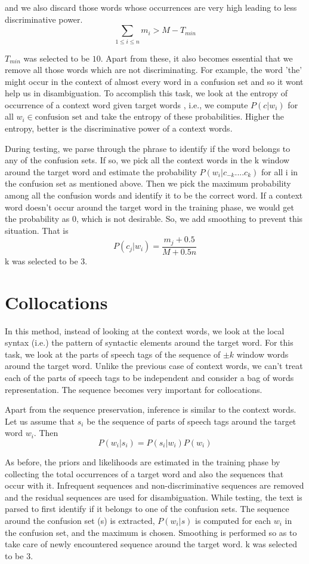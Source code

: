 \documentclass{article}
\begin{document}
and we also discard those words whose occurrences are very high leading to less discriminative power.
\[
\sum_{1\leq i \leq n} m_{i} > M - T_{min} 
\] 

$T_{min}$ was selected to be $10$. Apart from these, it also becomes essential that we remove all those words which are not discriminating. For example, the word 'the' might occur in the context of almost every word in a confusion set and so it wont help us in disambiguation. To accomplish this task, we look at the entropy of occurrence of a context word given target words , i.e., we compute $P(c|w_{i})$ for all $w_{i} \in \mbox{confusion set}$ and take the entropy of these probabilities. Higher the entropy, better is the discriminative power of a context words.

During testing, we parse through the phrase to identify if the word belongs to any of the confusion sets. If so, we pick all the context words in the k window around the target word and estimate the probability $P(w_{i}|c_{-k}....c_{k})$ for all i in the confusion set as mentioned above. Then we pick the maximum probability among all the confusion words and identify it to be the correct word. If a context word doesn't occur around the target word in the training phase, we would get the probability as $0$, which is not desirable. So, we add smoothing to prevent this situation. That is
\[
 P(c_{j}|w_{i}) = \frac{m_{j}+0.5}{M+0.5n} 
 \]
k was selected to be $3$. 
\section{Collocations}

In this method, instead of looking at the context words, we look at the local syntax (i.e.) the pattern of syntactic elements around the target word. For this task, we look at the parts of speech tags of the sequence of $\pm k$ window words around the target word. Unlike the previous case of context words, we can't treat each of the parts of speech tags to be independent and consider a bag of words representation. The sequence becomes very important for collocations. 

Apart from the sequence preservation, inference is similar to the context words. Let us assume that $s_{i}$ be the sequence of parts of speech tags around the target word $w_{i}$. Then 
\[
P(w_{i}|s_{i}) = P(s_{i}|w_{i})P(w_{i})
\]

As before, the priors and likelihoods are estimated in the training phase by collecting the total occurrences of a target word and also the sequences that occur with it. Infrequent sequences and non-discriminative sequences are removed and the residual sequences are used for disambiguation. While testing, the text is parsed to first identify if it belongs to one of the confusion sets. The sequence around the confusion set (s) is extracted, $P(w_{i}|s)$ is computed for each $w_{i}$ in the confusion set, and the maximum is chosen. Smoothing is performed so as to take care of newly encountered sequence around the target word. k was selected to be $3$.
\end{document}
